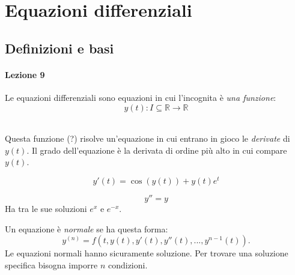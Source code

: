 



\chapter{Equazioni differenziali}
\section{Definizioni e basi}
\subsubsection{Lezione 9}

\begin{definizione}
Le equazioni differenziali sono equazioni in cui l'incognita è \textit{una funzione}:
\begin{equation*}
    y(t): I \subseteq \mathbb{R} \to \mathbb{R}
\end{equation*}
\end{definizione}

\leavevmode \\
Questa funzione (?) risolve un'equazione in cui entrano in gioco le \textit{derivate} di $y(t)$. Il grado dell'equazione è la derivata di ordine più alto in cui compare $y(t)$.

\begin{esempio}
    \begin{equation*}
        y'(t) = \cos(y(t)) + y(t) e^t
    \end{equation*}
\end{esempio}
\begin{esempio}
    \begin{equation*}
        y'' = y
    \end{equation*}
    Ha tra le sue soluzioni $e^x$ e $e^{-x}$.
\end{esempio}

\begin{definizione}
    Un equazione è \textit{normale} se ha questa forma:
    \begin{equation*}
        y^{(n)} = f(t, y(t), y'(t), y''(t), ..., y^{n-1}(t)).
    \end{equation*}
    Le equazioni normali hanno sicuramente soluzione. Per trovare una soluzione specifica bisogna imporre $n$ condizioni.
\end{definizione}

